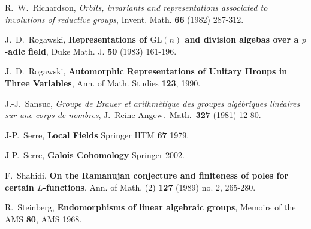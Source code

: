 \documentclass[12pt]{amsart}
\theoremstyle{remark}
\numberwithin{equation}{section}
\newcommand{\GL}{\mathrm{GL}}
\theoremstyle{definition}
\numberwithin{equation}{subsection}
\begin{document}
\begin{thebibliography}{}
 R.~W.~Richardson, \emph{Orbits, invariants and
representations associated to involutions of reductive groups},
Invent. Math. { \bf 66} (1982) 287-312.

 J.~D.~Rogawski, \textbf{ Representations of $\GL(n)$ and division algebas over a $p$-adic field}, Duke Math. J. {\bf 50}
(1983)
161-196.

 J.~D.~Rogawski, \textbf{Automorphic Representations
of Unitary Hroups in Three Variables}, Ann. of Math. Studies { \bf
123}, 1990.

 J.-J.~Sansuc, \emph{Groupe de Brauer et arithm\`etique des groupes alg\'ebriques lin\'eaires sur une corps de nombres}, J.~Reine Angew.~Math.~{\bf 327} (1981) 12-80.

 J-P.~Serre, \textbf{Local Fields} Springer HTM {\bf 67} 1979.

 J-P.~Serre, \textbf{Galois Cohomology} Springer 2002.

 F.~Shahidi, \textbf{On the Ramanujan conjecture and finiteness of poles for certain $L$-functions}, Ann. of Math. (2) {\bf 127}
(1989) no. 2, 265-280.

 R.~Steinberg, \textbf{Endomorphisms of linear algebraic groups}, Memoirs of the AMS {\bf 80}, AMS 1968.


\end{thebibliography}

\printindex
\end{document}
